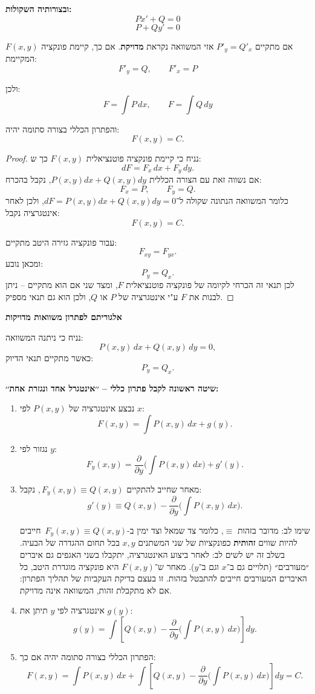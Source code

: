 \documentclass{article}
\numberwithin{equation}{section}
\begin{document}
\textbf{ובצורותיה השקולות:}
\begin{equation}
Px' + Q = 0
\end{equation}
\begin{equation}
P + Qy' = 0
\end{equation}

אם מתקיים $P'_y = Q'_x$ אזי המשוואה נקראת \textbf{מדויקת}.  
אם כך, קיימת פונקציה $F(x,y)$ המקיימת:
\[
F'_y = Q, \qquad F'_x = P
\]

ולכן:
\[
F = \int P\,dx, 
\qquad 
F = \int Q\,dy
\]

והפתרון הכללי בצורה סתומה יהיה:
\[
F(x,y) = C.
\]

\begin{proof}
נניח כי קיימת פונקציה פוטנציאלית $F(x,y)$ כך ש:
\[
dF = F_x\,dx + F_y\,dy.
\]
אם נשווה זאת עם הצורה הכללית $P(x,y)dx + Q(x,y)dy$, נקבל בהכרח:
\[
F_x = P, \qquad F_y = Q.
\]
 כלומר המשוואה הנתונה שקולה ל־$dF=P(x,y)dx + Q(x,y)dy=0$, ולכן לאחר אינטגרציה נקבל: 
\[
F(x,y) = C.
\]

עבור פונקציה גזירה היטב מתקיים:
\[
F_{xy} = F_{yx}.
\]
ומכאן נובע:
\[
P_y = Q_x.
\]
לכן תנאי זה הכרחי לקיומה של פונקציה פוטנציאלית $F$, ומצד שני אם הוא מתקיים – ניתן לבנות את $F$ ע"י אינטגרציה של $P$ או $Q$, ולכן הוא גם תנאי מספיק.  
\end{proof}
\textbf{אלגוריתם לפתרון משוואות מדויקות}

נניח כי ניתנה המשוואה:
\[
P(x,y)\,dx + Q(x,y)\,dy = 0,
\]
כאשר מתקיים תנאי הדיוק:
\[
P_y = Q_x.
\]

\textbf{שיטה ראשונה לקבל פתרון כללי – ׳׳אינטגרל אחד ונגזרת אחת׳׳:}

\begin{enumerate}
\item נבצע אינטגרציה של $P(x,y)$ לפי $x$:
\[
F(x,y) = \int P(x,y)\,dx + g(y).
\]

\item נגזור לפי $y$:
\[
F_y(x,y) = \frac{\partial}{\partial y}\Big(\int P(x,y)\,dx\Big) + g'(y).
\]

\item מאחר שחייב להתקיים \(\,F_y(x,y)\equiv Q(x,y)\), נקבל:
\[
g'(y) \equiv Q(x,y) - \frac{\partial}{\partial y}\Big(\int P(x,y)\,dx\Big).
\]

שימו לב: מדובר בזהות \(\equiv\), כלומר צד שמאל וצד ימין ב-\(\,F_y(x,y)\equiv Q(x,y)\) חייבים להיות שווים \textbf{זהותית} כפונקציות של שני המשתנים $x,y$ בכל תחום ההגדרה של הבעיה. בשלב זה יש לשים לב: לאחר ביצוע האינטגרציה, יתקבלו בשני האגפים גם איברים ״מעורבים״ (תלויים גם ב־$x$ וגם ב־$y$).  
מאחר ש־$F(x,y)$ היא פונקציה מוגדרת היטב, כל האיברים המעורבים חייבים להתבטל בזהות.  
זו בעצם בדיקת העקביות של תהליך הפתרון: אם לא מתקבלת זהות, המשוואה אינה מדויקת.

\item אינטגרציה לפי $y$ תיתן את $g(y)$:
\[
g(y) = \int \left[Q(x,y) - \frac{\partial}{\partial y}\Big(\int P(x,y)\,dx\Big)\right]dy.
\]

\item הפתרון הכללי בצורה סתומה יהיה אם כך:
\[
F(x,y) = \boxed{\int P(x,y)\,dx + \int \left[Q(x,y) - \frac{\partial}{\partial y}\Big(\int P(x,y)\,dx\Big)\right]dy =  C}.
\]
\end{enumerate}
\end{document}
